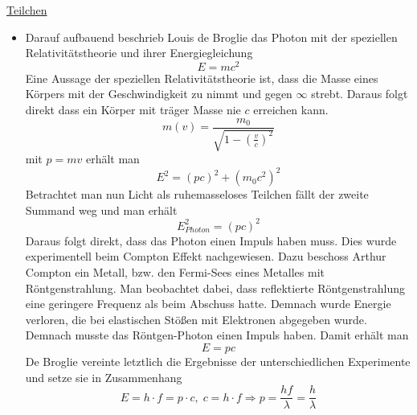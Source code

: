 	\newpage
	\begin{minipage}[t]{.5\textwidth}
		\underline{Teilchen}
		\begin{itemize}
			\item Darauf aufbauend beschrieb Louis de Broglie das Photon mit der speziellen Relativitätstheorie und ihrer Energiegleichung
		\begin{equation}
		E = mc^2
		\end{equation}
		Eine Aussage der speziellen Relativitätstheorie ist, dass die Masse eines Körpers mit der Geschwindigkeit zu nimmt und gegen $\infty$ strebt. Daraus folgt direkt dass ein Körper mit träger Masse nie $c$ erreichen kann. 
		\begin{equation}
			m(v) = \displaystyle\frac{m_0}{\sqrt{1-(\frac{v}{c})^2}}
		\end{equation}
		mit $p=mv$ erhält man 
		\begin{equation}
			E^2 = (pc)^2 + (m_0 c^2)^2
		\end{equation}
		Betrachtet man nun Licht als ruhemasseloses Teilchen fällt der zweite Summand weg und man erhält
		\begin{equation}
			E_{Photon}^2 = (pc)^2
		\end{equation}
		Daraus folgt direkt, dass das Photon einen Impuls haben muss. Dies wurde experimentell beim Compton Effekt nachgewiesen. Dazu beschoss Arthur Compton ein Metall, bzw. den Fermi-Sees eines Metalles mit Röntgenstrahlung. Man beobachtet dabei, dass reflektierte Röntgenstrahlung eine geringere Frequenz als beim Abschuss hatte. Demnach wurde Energie verloren, die bei elastischen Stößen mit Elektronen abgegeben wurde. Demnach musste das Röntgen-Photon einen Impuls haben. Damit erhält man
		\begin{equation}
			E = pc
		\end{equation}
		De Broglie vereinte letztlich die Ergebnisse der unterschiedlichen Experimente und setze sie in Zusammenhang
		\begin{equation}
		E = h\cdot f = p \cdot c ,\; c = h \cdot f  \Rightarrow  p = \frac{hf}{\lambda} = \frac{h}{\lambda}
		\end{equation} \label{eq_deBrog_a}
		\end{itemize}
	\end{minipage}
	\begin{minipage}[t]{.5\textwidth}
	$\;$
	\end{minipage}
	
